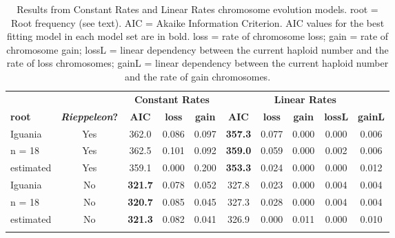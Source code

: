 \begin{longtable}{lccccccccc}

\caption{Results from Constant Rates and Linear Rates chromosome evolution models. root = Root frequency (see text). AIC = Akaike Information Criterion. AIC values for the best fitting model in each model set are in bold. loss = rate of chromosome loss; gain = rate of chromosome gain; lossL = linear dependency between the current haploid number and the rate of loss chromosomes; gainL = linear dependency between the current haploid number and the rate of gain chromosomes.
}\\ 
  
\hline
 &  & \multicolumn{3}{c}{\textbf{Constant Rates}} & \multicolumn{5}{c}{\textbf{Linear Rates}} \\
\textbf{root} & \textbf{\textit{Rieppeleon}?} & 
\textbf{AIC} & \textbf{loss} & \textbf{gain} & 
\textbf{AIC} & \textbf{loss} & \textbf{gain} & \textbf{lossL} & \textbf{gainL} \\
\hline
Iguania &
Yes &
362.0 &
0.086 &
0.097 &
\textbf{357.3} &
0.077 &
0.000 &
0.000 &
0.006\\
n = 18 &
Yes &
362.5 &
0.101 &
0.092 &
\textbf{359.0} &
0.059 &
0.000 &
0.002 &
0.006\\
estimated &
Yes &
359.1 &
0.000 &
0.200 &
\textbf{353.3} &
0.024 &
0.000 &
0.000 &
0.012\\
Iguania &
No &
\textbf{321.7} &
0.078 &
0.052 &
327.8 &
0.023 &
0.000 &
0.004 &
0.004 \\
n = 18  &
No &
\textbf{320.7} &
0.085 &
0.045 &
327.3 &
0.028 &
0.000 &
0.004 &
0.004\\
estimated &
No &
\textbf{321.3} &
0.082 &
0.041 &
326.9 &
0.000 &
0.011 &
0.000 &
0.010\\
\hline

\label{table-models}
\end{longtable}


















